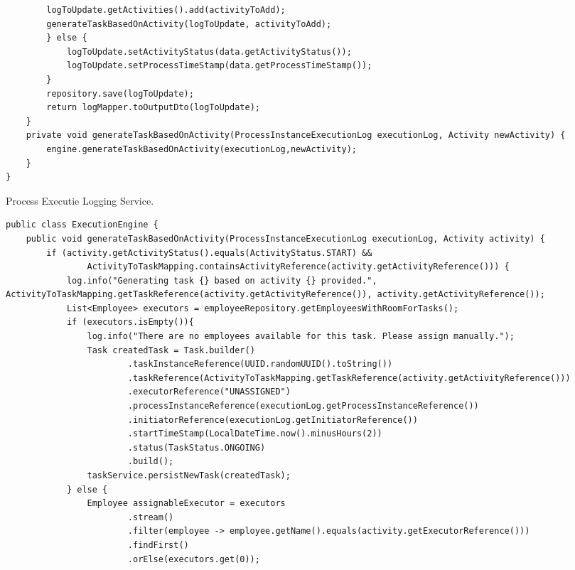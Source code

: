 \begin{listing}
\begin{verbatim}
        logToUpdate.getActivities().add(activityToAdd);
        generateTaskBasedOnActivity(logToUpdate, activityToAdd);
        } else {
            logToUpdate.setActivityStatus(data.getActivityStatus());
            logToUpdate.setProcessTimeStamp(data.getProcessTimeStamp());
        }
        repository.save(logToUpdate);
        return logMapper.toOutputDto(logToUpdate);
    }
    private void generateTaskBasedOnActivity(ProcessInstanceExecutionLog executionLog, Activity newActivity) {
        engine.generateTaskBasedOnActivity(executionLog,newActivity);
    }
}
  \end{verbatim}
  \caption[Process Executie Logging Service]{Process Executie Logging Service.}
\end{listing}

\begin{listing}
  \begin{verbatim}
public class ExecutionEngine {
    public void generateTaskBasedOnActivity(ProcessInstanceExecutionLog executionLog, Activity activity) {
        if (activity.getActivityStatus().equals(ActivityStatus.START) &&
                ActivityToTaskMapping.containsActivityReference(activity.getActivityReference())) {
            log.info("Generating task {} based on activity {} provided.", ActivityToTaskMapping.getTaskReference(activity.getActivityReference()), activity.getActivityReference());
            List<Employee> executors = employeeRepository.getEmployeesWithRoomForTasks();
            if (executors.isEmpty()){
                log.info("There are no employees available for this task. Please assign manually.");
                Task createdTask = Task.builder()
                        .taskInstanceReference(UUID.randomUUID().toString())
                        .taskReference(ActivityToTaskMapping.getTaskReference(activity.getActivityReference()))
                        .executorReference("UNASSIGNED")
                        .processInstanceReference(executionLog.getProcessInstanceReference())
                        .initiatorReference(executionLog.getInitiatorReference())
                        .startTimeStamp(LocalDateTime.now().minusHours(2))
                        .status(TaskStatus.ONGOING)
                        .build();
                taskService.persistNewTask(createdTask);
            } else {
                Employee assignableExecutor = executors
                        .stream()
                        .filter(employee -> employee.getName().equals(activity.getExecutorReference()))
                        .findFirst()
                        .orElse(executors.get(0));


\end{verbatim}
\end{listing}
